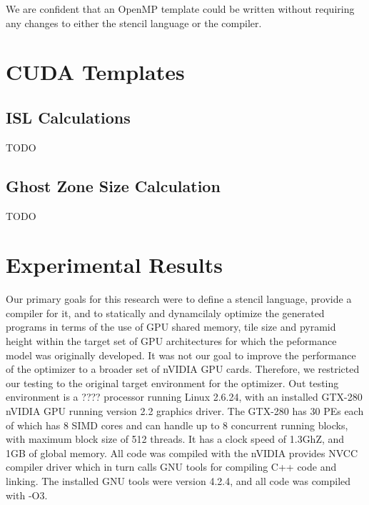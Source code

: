 \documentclass{styles/sig-alternate}
\begin{document}
We are confident that an OpenMP template could be written without
requiring any changes to either the stencil language or the compiler.

\section{CUDA Templates}

\subsection{ISL Calculations}

TODO

\subsection{Ghost Zone Size Calculation}

TODO

\section{Experimental Results}

Our primary goals for this research were to define a stencil language, provide a compiler for it, 
and to statically and dynamcilaly optimize the generated programs in terms of the use of GPU shared memory, 
tile size and pyramid height within the target set of GPU architectures for which the peformance model was 
originally developed.  It was not our goal to improve the performance of the optimizer to a broader set of 
nVIDIA GPU cards.  Therefore, we restricted our testing to the original target environment for the optimizer.
Out testing environment is a ???? processor running Linux 2.6.24, with an installed GTX-280 nVIDIA GPU running 
version 2.2 graphics driver.  The GTX-280 has 30 PEs each of which has 8 SIMD cores and can handle up to 8 
concurrent running blocks, with maximum block size of 512 threads.  It has a clock speed of 1.3GhZ, and 1GB of
global memory.  All code was compiled with the nVIDIA provides NVCC compiler driver which in turn 
calls GNU tools for compiling C++ code and linking.  The installed GNU tools were version 4.2.4, and all code was
compiled with -O3.
\end{document}
